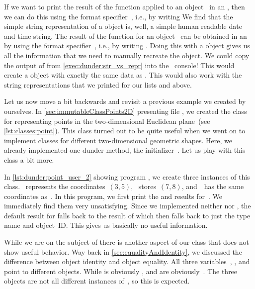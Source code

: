If we want to print the result of the  function applied to an object~ in an , then we can do this using the format specifier~, i.e., by writing 
We find that the simple string representation of a  object is, well, a simple human readable date and time string.
The result of the function  for an object~ can be obtained in an  by using the format specifier~, i.e., by writing .
Doing this with a  object gives us all the information that we need to manually recreate the object.
We could copy the output of  from \cref{exec:dunder:str_vs_repr} into the \python\ console!
This would create a  object with exactly the same data as .
This would also work with the string representations that we printed for our lists  and  above.

%
%
%
Let us now move a bit backwards and revisit a previous example we created by ourselves.
In \cref{sec:immutableClassPoints2D} presenting file , we created the class  for representing points in the two-dimensional Euclidean plane~(see \cref{lst:classes:point}).
This class turned out to be quite useful when we went on to implement classes for different two-dimensional geometric shapes.
Here, we already implemented one dunder method, the initializer~.
Let us play with this class a bit more.

In \cref{lst:dunder:point_user_2} showing program , we create three instances of this class.
~represents the coordinates~$(3,5)$, ~stores~$(7, 8)$, and~~has the same coordinates as~.
In this program, we first print the  and  results for~.
We immediately find them very unsatisfying.
Since we implemented neither  nor , the default result for  falls back to the result of  which then falls back to just the type name and object~ID.
This gives us basically no useful information.

While we are on the subject of  there is another aspect of our  class that does not show useful behavior.
Way back in \cref{sec:equalityAndIdentity}, we discussed the difference between object identity and object equality.
All three variables~, , and~ point to different objects.
While  is obviously ,  and  are obviously~.
The three objects are not all different instances of~, so this is expected.

